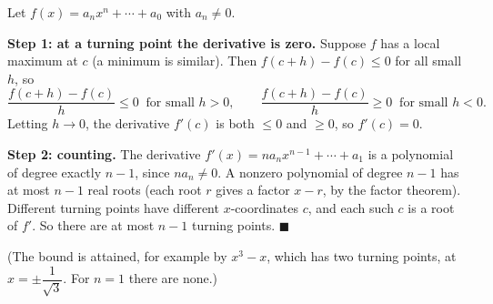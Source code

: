 Let $f(x)=a_nx^n+\cdots+a_0$ with $a_n\ne0$.

\textbf{Step 1: at a turning point the derivative is zero.} Suppose $f$ has a local maximum at $c$ (a minimum is similar). Then $f(c+h)-f(c)\le0$ for all small $h$, so
\[\dfrac{f(c+h)-f(c)}{h}\le0\ \text{ for small }h>0,\qquad \dfrac{f(c+h)-f(c)}{h}\ge0\ \text{ for small }h<0.\]
Letting $h\to0$, the derivative $f'(c)$ is both $\le0$ and $\ge0$, so $f'(c)=0$.

\textbf{Step 2: counting.} The derivative $f'(x)=na_nx^{n-1}+\cdots+a_1$ is a polynomial of degree exactly $n-1$, since $na_n\ne0$. A nonzero polynomial of degree $n-1$ has at most $n-1$ real roots (each root $r$ gives a factor $x-r$, by the factor theorem). Different turning points have different $x$-coordinates $c$, and each such $c$ is a root of $f'$. So there are at most $n-1$ turning points. $\blacksquare$

(The bound is attained, for example by $x^3-x$, which has two turning points, at $x=\pm\dfrac{1}{\sqrt3}$. For $n=1$ there are none.)
